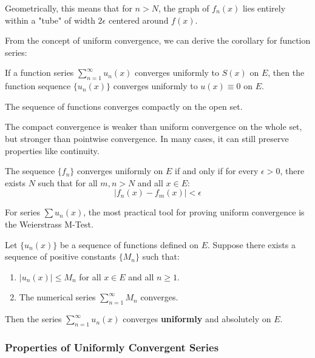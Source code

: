 Geometrically, this means that for $n > N$, the graph of $f_n(x)$ lies entirely within a "tube" of width $2\epsilon$ centered around $f(x)$.

From the concept of uniform convergence, we can derive the corollary for function series:

\begin{corollary}
    If a function series $\sum_{n=1}^{\infty} u_n(x)$ converges uniformly to $S(x)$ on $E$, then the function sequence $\{u_n(x)\}$ converges uniformly to $u(x) \equiv 0$ on $E$.
\end{corollary}

\begin{definition}
    The sequence of functions converges compactly on the open set.
\end{definition}

The compact convergence is weaker than uniform convergence on the whole set, but stronger than pointwise convergence. In many cases, it can still preserve properties like continuity.

\begin{theorem}
The sequence $\{f_n\}$ converges uniformly on $E$ if and only if for every $\epsilon > 0$, there exists $N$ such that for all $m, n > N$ and all $x \in E$:
\[ |f_n(x) - f_m(x)| < \epsilon \]
\end{theorem}

For series $\sum u_n(x)$, the most practical tool for proving uniform convergence is the Weierstrass M-Test.

\begin{theorem}
Let $\{u_n(x)\}$ be a sequence of functions defined on $E$. Suppose there exists a sequence of positive constants $\{M_n\}$ such that:
\begin{enumerate}
    \item $|u_n(x)| \le M_n$ for all $x \in E$ and all $n \ge 1$.
    \item The numerical series $\sum_{n=1}^{\infty} M_n$ converges.
\end{enumerate}
Then the series $\sum_{n=1}^{\infty} u_n(x)$ converges \textbf{uniformly} and absolutely on $E$.
\end{theorem}

\subsubsection{Properties of Uniformly Convergent Series}

